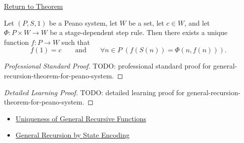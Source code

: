 \newpage
{}
\label{prf:general-recursion-theorem-for-peano-system}

\begin{remark*}[Return]
\hyperref[thm:general-recursion-theorem-for-peano-system]{Return to Theorem}
\end{remark*}

\begin{theorem*}
Let $(P,S,1)$ be a Peano system, let $W$ be a set, let $c\in W$, and let
$\Phi:P\times W\to W$ be a stage-dependent step rule. Then there exists a
unique function $f:P\to W$ such that
\[
f(1)=c
\qquad\text{and}\qquad
\forall n\in P\;(f(S(n))=\Phi(n,f(n))).
\]
\end{theorem*}

\begin{proof}[Professional Standard Proof]
\LRAProofBodyStart
TODO: professional standard proof for general-recursion-theorem-for-peano-system.
\end{proof}

\begin{proof}[Detailed Learning Proof]
\LRAProofBodyStart
TODO: detailed learning proof for general-recursion-theorem-for-peano-system.
\end{proof}

\begin{remark*}
\end{remark*}

\begin{dependencies}
\begin{itemize}
  \item \hyperref[lem:uniqueness-of-general-recursive-functions]{Uniqueness of General Recursive Functions}
  \item \hyperref[thm:general-recursion-by-state-encoding]{General Recursion by State Encoding}
\end{itemize}
\end{dependencies}

\clearpage
